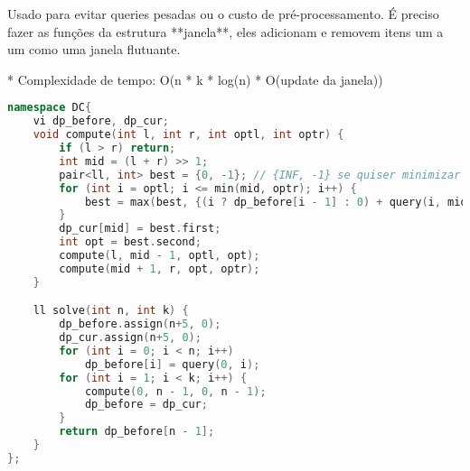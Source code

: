 \documentclass[11pt, a4paper, twoside]{article}
\begin{document}
Usado para evitar queries pesadas ou o custo de pré-processamento.  
É preciso fazer as funções da estrutura **janela**, eles adicionam e removem itens um a um como uma janela flutuante.

* Complexidade de tempo: O(n * k * log(n) * O(update da janela))



\begin{lstlisting}[language=C++]
namespace DC{
    vi dp_before, dp_cur;
    void compute(int l, int r, int optl, int optr) {
        if (l > r) return;
        int mid = (l + r) >> 1;
        pair<ll, int> best = {0, -1}; // {INF, -1} se quiser minimizar
        for (int i = optl; i <= min(mid, optr); i++) {
            best = max(best, {(i ? dp_before[i - 1] : 0) + query(i, mid), i}); // min() se quiser minimizar
        }
        dp_cur[mid] = best.first;
        int opt = best.second;
        compute(l, mid - 1, optl, opt);
        compute(mid + 1, r, opt, optr);
    }

    ll solve(int n, int k) {
        dp_before.assign(n+5, 0);
        dp_cur.assign(n+5, 0);
        for (int i = 0; i < n; i++)
            dp_before[i] = query(0, i);
        for (int i = 1; i < k; i++) {
            compute(0, n - 1, 0, n - 1);
            dp_before = dp_cur;
        }
        return dp_before[n - 1];
    }
};
\end{lstlisting}
\end{document}
